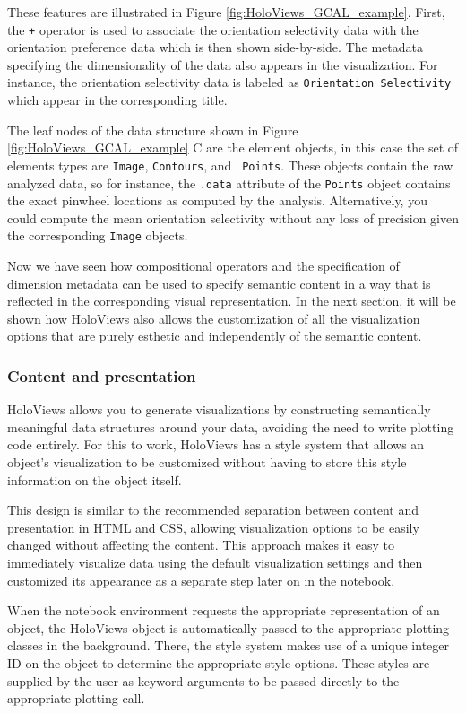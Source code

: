 \documentclass[phd,ianc,twoside]{infthesis}
\begin{document}
These features are illustrated in Figure
\ref{fig:HoloViews_GCAL_example}. First, the {\tt +} operator is used to
associate the orientation selectivity data with the orientation
preference data which is then shown side-by-side. The metadata
specifying the dimensionality of the data also appears in the
visualization. For instance, the orientation selectivity data is
labeled as {\tt Orientation Selectivity} which appear in the
corresponding title.

The leaf nodes of the data structure shown in Figure
\ref{fig:HoloViews_GCAL_example} C are the element objects, in this case
the set of elements types are {\tt Image}, {\tt Contours}, and {\tt
  Points}. These objects contain the raw analyzed data, so for instance,
the {\tt .data} attribute of the {\tt Points} object contains the exact
pinwheel locations as computed by the analysis. Alternatively, you could
compute the mean orientation selectivity without any loss of precision
given the corresponding {\tt Image} objects.

Now we have seen how compositional operators and the specification of
dimension metadata can be used to specify semantic content in a way that
is reflected in the corresponding visual representation. In the next
section, it will be shown how HoloViews also allows the customization of
all the visualization options that are purely esthetic and independently
of the semantic content.

\subsubsection*{Content and presentation}

HoloViews allows you to generate visualizations by constructing
semantically meaningful data structures around your data, avoiding the
need to write plotting code entirely. For this to work, HoloViews has a
style system that allows an object's visualization to be customized
without having to store this style information on the object itself.

This design is similar to the recommended separation between content and
presentation in HTML and CSS, allowing visualization options to be
easily changed without affecting the content. This approach makes it
easy to immediately visualize data using the default visualization
settings and then customized its appearance as a separate step later on
in the notebook.

When the notebook environment requests the appropriate representation of
an object, the HoloViews object is automatically passed to the
appropriate plotting classes in the background. There, the style system
makes use of a unique integer ID on the object to determine the
appropriate style options. These styles are supplied by the user as
keyword arguments to be passed directly to the appropriate plotting
call.
\end{document}
